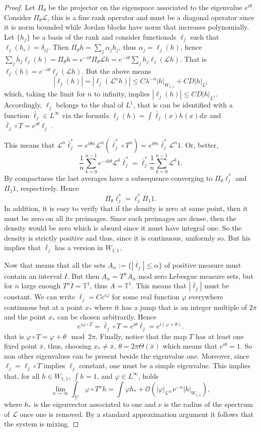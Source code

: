\documentclass{amsart}
\numberwithin{equation}{section}
\newcommand\Lp{{\mathcal L}}
\newcommand\Or{{\mathcal O}}
\newcommand\To{{\mathbb T}}
\newcommand\vf{\varphi}
\begin{document}
\begin{proof}
Let $\Pi_\theta$ be the 
projector on the eigenspace associated to the eigenvalue
$e^{i\theta}$. Consider $\Pi_\theta\Lp$, this 
is a fine rank operator and must be a diagonal operator since it is
norm bounded while Jordan blocks have norm that increases
polynomially. Let $\{h_j\}$ be a basis of the rank and consider
functionals $\ell_j$ such that $\ell_j(h_i)=\delta_{ij}$. Then $\Pi_\theta
h=\sum_j \alpha_j h_j$, thus $\alpha_j=\ell_j(h)$, hence
$\sum_jh_j\ell_j(h)=\Pi_\theta h=e^{-i\theta}\Pi_\theta\Lp
h=e^{-i\theta}\sum_jh_j\ell_j(\Lp h)$. That is 
$\ell_j(h)=e^{-i\theta}\ell_j(\Lp h)$. But the above means
\[
|\ell_j(h)|=|\ell_j(\Lp^n h)|\leq C\lambda^{-n}|h|_{W_{1,1}}+
C D|h|_{L^1}
\]
which, taking the limit for $n$ to infinity, implies $|\ell_j(h)|\leq
C D|h|_{L^1}$. Accordingly, $\ell_j$ belongs to the dual of $L^1$,
that is can be identified with a function $\bar \ell_j\in L^\infty$
via the formula $\ell_j(h)=\int\bar \ell_j(x)h(x) dx$ and $\bar
\ell_j\circ T=e^{i\theta}\ell_j$ .  

This means that $\Lp^n\bar \ell_j^*=e^{i\theta n}\Lp^n(\bar \ell_j^*\circ
T^n)=e^{i\theta n}\bar \ell_j^*\Lp^n 1$. Or, better,
\[
\frac 1n \sum_{k=0}^{n-1}e^{-ik\theta}\Lp^k\bar \ell_j^*=\bar
\ell_j^*\frac 1n \sum_{k=0}^{n-1} \Lp^k 1.
\]
By compactness the last averages have a subsequence converging to
$\Pi_\theta\ell_j^*$ and $\Pi_1 1$, respectively. Hence 
\[
\Pi_\theta\ell_j^*=\ell_j^*\Pi_1 1.
\]
In addition, it is easy to verify that if the density 
is zero at same point, then it must be zero on all its
preimages. Since such preimages are dense, then the density would be
zero which is absurd since it must have integral one. So the density
is strictly positive and thus, since it is continuous, uniformly
so. But his implies that $\bar\ell_j$ has a version in $W_{1,1}$.
 
Now that means that all the
sets $A_\alpha:=\{|\bar \ell_j|\leq \alpha\}$ of positive measure must
contain an interval 
$I$. But then $A_\alpha=T^n A_\alpha$ mod zero Lebesgue measure sets,
but for $n$ large enough $T^nI=\To^1$, thus $A=\To^1$. This means that
$|\bar \ell_j|$ must be constant. We
can write $\bar \ell_j=Ce^{i\vf}$ for 
some real function $\vf$ everywhere continuous but at a point $x_*$
where it has a jump that is an integer multiple of $2\pi$ and the
point $x_*$ can be chosen arbitrarily. Hence
\[
e^{i\vf\circ T}=\bar \ell_j\circ T=e^{i\theta}\bar
\ell_j=e^{i(\vf+\theta)}.
\]
that is $\vf\circ T=\vf+\theta\mod 2\pi$. Finally, notice that the map $T$ has
at least one fixed point $\bar x$, thus, choosing $x_*\neq \bar x$,
$\theta=2\pi \Theta(\bar x)$ which means that $e^{i\theta}=1$.
So non other eigenvalues can be present beside the eigenvalue
one. Moreover, since $\ell_j=\ell_j\circ T$ implies $\ell_j$ constant,
one must be a simple eigenvalue. This implies that, for all $h\in
W_{1,1}$, $\int h=1$, and $\vf\in L^\infty$, holds
\[
\lim_{n\to\infty}\int_{\To^1}\vf\circ T^n
h=\int \vf h_*+\Or(|\vf|_{L^\infty}\nu^{-n}|h|_{W_{1,1}}),
\]
where $h_*$ is the eigenvector associated to one and $\nu$ is the
radius of the spectrum of $\Lp$ once  one is 
removed. By a standard approximation argument it follows that the
system is mixing.
\end{proof}
\end{document}
